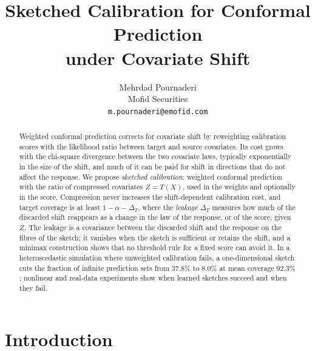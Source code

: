 \documentclass[11pt,a4paper]{article}
\title{Sketched Calibration for Conformal Prediction\\ under Covariate Shift}
\author{Mehrdad Pournaderi\\ Mofid Securities\\ \texttt{m.pournaderi@emofid.com}}
\date{}
\theoremstyle{plain}
\theoremstyle{definition}
\theoremstyle{remark}
\begin{document}
\maketitle

\begin{abstract}
Weighted conformal prediction corrects for covariate shift by reweighting calibration scores with the likelihood ratio between target and source covariates. Its cost grows with the chi-square divergence between the two covariate laws, typically exponentially in the size of the shift, and much of it can be paid for shift in directions that do not affect the response. We propose \emph{sketched calibration}: weighted conformal prediction with the ratio of compressed covariates $Z=T(X)$, used in the weights and optionally in the score. Compression never increases the shift-dependent calibration cost, and target coverage is at least $1-\alpha-\Delta_T$, where the \emph{leakage} $\Delta_T$ measures how much of the discarded shift reappears as a change in the law of the response, or of the score, given $Z$. The leakage is a covariance between the discarded shift and the response on the fibres of the sketch; it vanishes when the sketch is sufficient or retains the shift, and a minimax construction shows that no threshold rule for a fixed score can avoid it. In a heteroscedastic simulation where unweighted calibration fails, a one-dimensional sketch cuts the fraction of infinite prediction sets from $37.8\%$ to $8.0\%$ at mean coverage $92.3\%$; nonlinear and real-data experiments show when learned sketches succeed and when they fail.
\end{abstract}

\section{Introduction}
\end{document}
